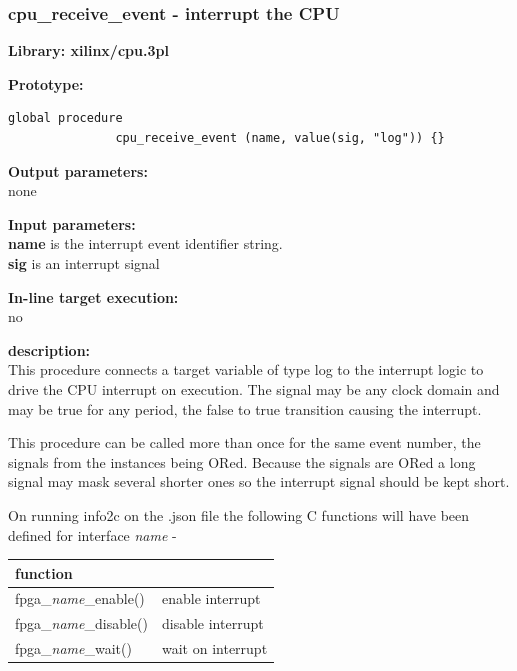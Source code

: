         \subsubsection{cpu\_receive\_event - interrupt the CPU}\label{sec:lprcvevent}

            {\bf Library: xilinx/cpu.3pl}

            {\bf Prototype:} \\
            \vsp
            \begin{lstlisting}[gobble=12, language=threepl]
               global procedure
               cpu_receive_event (name, value(sig, "log")) {}
            \end{lstlisting}

            {\bf Output parameters:} \\
            none

            {\bf Input parameters:} \\            
            {\bf name} is the interrupt event identifier string. \\
            {\bf sig} is an interrupt signal
        
            {\bf In-line target execution:} \\
            no

            {\bf description:} \\
            This procedure connects a target variable of type log to the interrupt
            logic to drive the CPU interrupt on execution. The signal may
            be any clock domain and may be true for any period, the false to
            true transition causing the interrupt.
            
            This procedure can be called more than once for the same event number,
            the signals from the instances being ORed. Because the signals are ORed
            a long signal may mask several shorter ones so the interrupt signal
            should be kept short.
            
            On running info2c on the .json file the following C functions will have been
            defined for interface {\em name} -
            
            \begin{tabular}{| l | l |}
            \hline
            function                     &                    \\ \hline \hline
            fpga\_{\em name}\_enable()   & enable interrupt   \\ \hline
            fpga\_{\em name}\_disable()  & disable interrupt  \\ \hline 
            fpga\_{\em name}\_wait()     & wait on interrupt  \\ \hline  
            \end{tabular}
            
